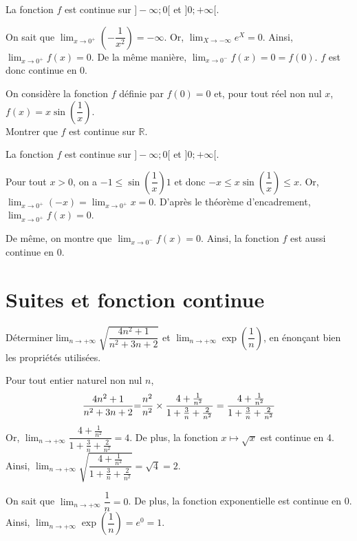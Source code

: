 \documentclass[11pt,fleqn, openany]{book} %
\begin{document}
\begin{solution}La fonction $f$ est continue sur $]-\infty ;0[$ et $]0;+\infty[$.

On sait que $\displaystyle\lim_{x\to 0^+}\left(-\dfrac{1}{x^2}\right)=-\infty$. Or, $\displaystyle \lim_{X \to -\infty}e^X=0$. Ainsi, $\displaystyle\lim_{x\to 0^+}f(x)=0$. De la même manière, $\displaystyle\lim_{x\to 0^-}f(x)=0=f(0)$. $f$ est donc continue en 0.\end{solution}

\begin{exercise}
On considère la fonction $f$ définie par $f(0)=0$ et, pour tout réel non nul $x$, $f(x)=x \sin\left(\dfrac{1}{x}\right)$. \\ Montrer que $f$ est continue sur $\mathbb{R}$.\end{exercise}

\begin{solution}La fonction $f$ est continue sur $]-\infty ;0[$ et $]0;+\infty[$.

Pour tout $x>0$, on a $-1 \leqslant \sin\left(\dfrac{1}{x}\right) 1$ et donc $-x \leqslant x\sin\left(\dfrac{1}{x}\right) \leqslant x$. Or, $\displaystyle\lim_{x\to 0^+}(-x)=\displaystyle\lim_{x\to 0^+}x=0$. D'après le théorème d'encadrement, $\displaystyle\lim_{x\to 0^+}f(x)=0$.

De même, on montre que $\displaystyle\lim_{x\to 0^-}f(x)=0$. Ainsi, la fonction $f$ est aussi continue en 0.\end{solution}


\section*{Suites et fonction continue}

\begin{exercise}Déterminer$\displaystyle\lim_{n\to +\infty} \sqrt{\dfrac{4n^2+1}{n^2+3n+2}}$ et $\displaystyle\lim_{n\to +\infty} \exp\left( \dfrac{1}{n}\right)$, en énonçant bien les propriétés utilisées.\end{exercise}


\begin{solution}Pour tout entier naturel non nul $n$, 
\[\dfrac{4n^2+1}{n^2+3n+2}$=$\dfrac{n^2}{n^2} \times \dfrac{4+\frac{1}{n^2}}{1+\frac{3}{n}+\frac{2}{n^2}}=\dfrac{4+\frac{1}{n^2}}{1+\frac{3}{n}+\frac{2}{n^2}}\]
Or, $\displaystyle \lim_{n \to + \infty} \dfrac{4+\frac{1}{n^2}}{1+\frac{3}{n}+\frac{2}{n^2}} = 4$. De plus, la fonction $x\mapsto \sqrt{x}$ est continue en 4. \\ Ainsi, $\displaystyle \lim_{n \to + \infty} \sqrt{\dfrac{4+\frac{1}{n^2}}{1+\frac{3}{n}+\frac{2}{n^2}}}=\sqrt{4}=2$.

On sait que $\displaystyle \lim_{n \to + \infty} \dfrac{1}{n}=0$. De plus, la fonction exponentielle est continue en 0. \\ Ainsi, $\displaystyle \lim_{n \to + \infty}\exp\left(\dfrac{1}{n}\right)=e^0=1$.\end{solution}
\end{document}
